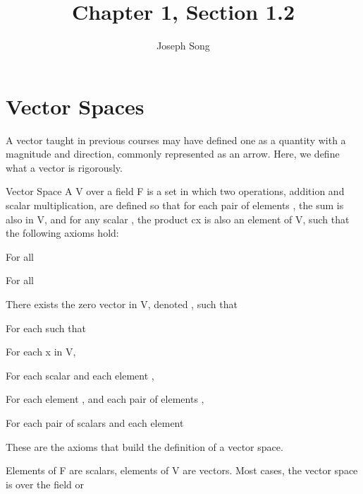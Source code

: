 \documentclass{article}
\title{Chapter 1, Section 1.2}
\author{Joseph Song}
\date{}
\begin{document}
\maketitle

\section{Vector Spaces}

A vector taught in previous courses may have defined one as a quantity with a magnitude and direction, commonly represented as an arrow. Here, we define what a vector is rigorously.

\begin{definition}{Vector Space}
A  V over a field F is a set in which two operations, addition and scalar multiplication, are defined so that for each pair of elements , the sum  is also in V, and for any scalar , the product cx is also an element of V, such that the following axioms hold:
\end{definition}

\begin{axioms}
    \item For all 
    \item For all 
    \item There exists the zero vector in V, denoted , such that 
    \item For each  such that 
    \item For each x in V, 
    \item For each scalar  and each element , 
    \item For each element , and each pair of elements , 
    \item For each pair of scalars  and each element 
\end{axioms}


\noindent These are the axioms that build the definition of a vector space.

Elements of F are scalars, elements of V are vectors. Most cases, the vector space is over the field  or 
\end{document}
